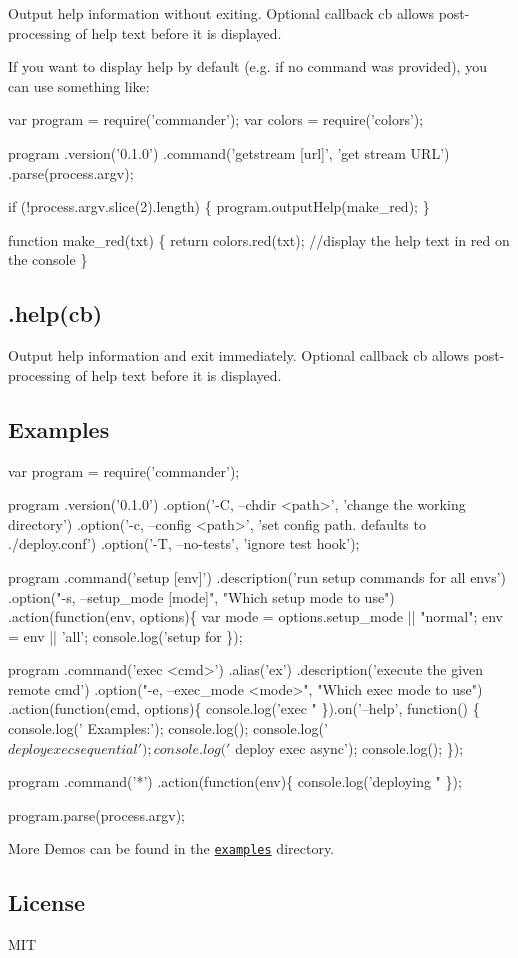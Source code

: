 Output help information without exiting. Optional callback cb allows post-\/processing of help text before it is displayed.

If you want to display help by default (e.\+g. if no command was provided), you can use something like\+:


\begin{DoxyCode}
var program = require('commander');
var colors = require('colors');

program
  .version('0.1.0')
  .command('getstream [url]', 'get stream URL')
  .parse(process.argv);

if (!process.argv.slice(2).length) \{
  program.outputHelp(make\_red);
\}

function make\_red(txt) \{
  return colors.red(txt); //display the help text in red on the console
\}
\end{DoxyCode}


\subsection*{.help(cb)}

Output help information and exit immediately. Optional callback cb allows post-\/processing of help text before it is displayed.

\subsection*{Examples}


\begin{DoxyCode}
var program = require('commander');

program
  .version('0.1.0')
  .option('-C, --chdir <path>', 'change the working directory')
  .option('-c, --config <path>', 'set config path. defaults to ./deploy.conf')
  .option('-T, --no-tests', 'ignore test hook');

program
  .command('setup [env]')
  .description('run setup commands for all envs')
  .option("-s, --setup\_mode [mode]", "Which setup mode to use")
  .action(function(env, options)\{
    var mode = options.setup\_mode || "normal";
    env = env || 'all';
    console.log('setup for %
  \});

program
  .command('exec <cmd>')
  .alias('ex')
  .description('execute the given remote cmd')
  .option("-e, --exec\_mode <mode>", "Which exec mode to use")
  .action(function(cmd, options)\{
    console.log('exec "%
  \}).on('--help', function() \{
    console.log('  Examples:');
    console.log();
    console.log('    $ deploy exec sequential');
    console.log('    $ deploy exec async');
    console.log();
  \});

program
  .command('*')
  .action(function(env)\{
    console.log('deploying "%
  \});

program.parse(process.argv);
\end{DoxyCode}


More Demos can be found in the \href{https://github.com/tj/commander.js/tree/master/examples}{\tt examples} directory.

\subsection*{License}

M\+IT 